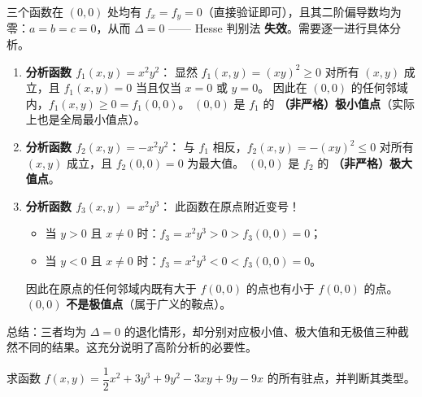 \documentclass[lang=cn,11pt]{elegantbook}
\begin{document}
\begin{solution}
三个函数在 $(0,0)$ 处均有 $f_x=f_y=0$（直接验证即可），且其二阶偏导数均为零：$a=b=c=0$，从而 $\Delta=0$ —— Hesse 判别法 \textbf{失效}。需要逐一进行具体分析。

\begin{enumerate}
  \item \textbf{分析函数 $f_1(x,y)=x^2y^2$}：
  显然 $f_1(x,y)=(xy)^2\geq 0$ 对所有 $(x,y)$ 成立，且 $f_1(x,y)=0$ 当且仅当 $x=0$ 或 $y=0$。
  因此在 $(0,0)$ 的任何邻域内，$f_1(x,y)\geq 0=f_1(0,0)$。
  $(0,0)$ 是 $f_1$ 的 \textbf{（非严格）极小值点}（实际上也是全局最小值点）。

  \item \textbf{分析函数 $f_2(x,y)=-x^2y^2$}：
  与 $f_1$ 相反，$f_2(x,y)=-(xy)^2\leq 0$ 对所有 $(x,y)$ 成立，且 $f_2(0,0)=0$ 为最大值。
  $(0,0)$ 是 $f_2$ 的 \textbf{（非严格）极大值点}。

  \item \textbf{分析函数 $f_3(x,y)=x^2y^3$}：
  此函数在原点附近变号！
  \begin{itemize}
    \item 当 $y>0$ 且 $x \neq 0$ 时：$f_3=x^2y^3>0>f_3(0,0)=0$；
    \item 当 $y<0$ 且 $x \neq 0$ 时：$f_3=x^2y^3<0<f_3(0,0)=0$。
  \end{itemize}
  因此在原点的任何邻域内既有大于 $f(0,0)$ 的点也有小于 $f(0,0)$ 的点。
  $(0,0)$ \textbf{不是极值点}（属于广义的鞍点）。
\end{enumerate}
总结：三者均为 $\Delta=0$ 的退化情形，却分别对应极小值、极大值和无极值三种截然不同的结果。这充分说明了高阶分析的必要性。
\end{solution}

\begin{example}[含三次项的多项式函数] \label{ex:cubic-polynomial-extreme}
求函数
$f(x,y)=\dfrac{1}{2} x^2+3y^3+9y^2-3xy+9y-9x$
的所有驻点，并判断其类型。
\end{example}
\end{document}
